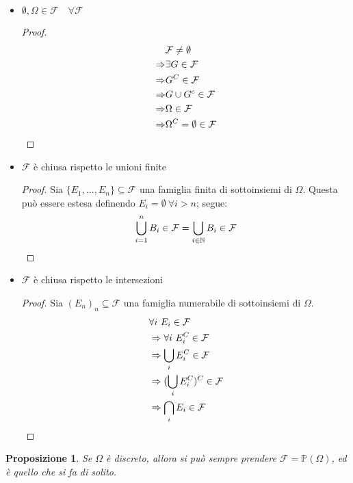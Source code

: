\documentclass{article}
\theoremstyle{plain}
\newtheorem{proposizione}{Proposizione}[section]
\theoremstyle{definition}
\theoremstyle{remark}
\begin{document}
\begin{itemize}
	\item $\emptyset,\Omega\in\mathcal{F}\quad\forall\mathcal{F}$
	\begin{proof}
		\begin{align*}
			&\mathcal{F}\neq\emptyset\\
			\Rightarrow&\exists G\in\mathcal{F}\\
			\Rightarrow&G^C\in\mathcal{F}\\
			\Rightarrow&G\cup G^c \in\mathcal{F}\\
			\Rightarrow&\Omega\in\mathcal{F}\\
			\Rightarrow&\Omega^C=\emptyset\in\mathcal{F}\qedhere
		\end{align*}
	\end{proof}
	\item $\mathcal{F}$ è chiusa rispetto le unioni finite
	\begin{proof}
		Sia $\{E_1,...,E_n\}\subseteq\mathcal{F}$ una famiglia finita di sottoinsiemi di $\Omega$. Questa può essere estesa definendo $E_i=\emptyset\ \forall i>n$; segue:
		\begin{equation*}
			\bigcup_{i=1}^n B_i\in\mathcal{F}=\bigcup_{i\in\mathbb{N}} B_i\in\mathcal{F}\qedhere
		\end{equation*}
	\end{proof}
	\item $\mathcal{F}$ è chiusa rispetto le intersezioni
	\begin{proof}
		Sia $(E_n)_n\subseteq\mathcal{F}$ una famiglia numerabile di sottoinsiemi di $\Omega$.
		\begin{align*}
			 &\forall i\ E_i\in\mathcal{F}\\
			 &\Rightarrow\forall i\ E_i^C\in\mathcal{F}\\
			 &\Rightarrow\bigcup_i E_i^C\in\mathcal{F}\\
			 &\Rightarrow(\bigcup_i E_i^C)^C\in\mathcal{F}\\
			 &\Rightarrow\bigcap_i E_i\in\mathcal{F}\qedhere
		\end{align*}
	\end{proof}
\end{itemize}
\begin{proposizione}
	Se $\Omega$ è discreto, allora si può sempre prendere $\mathcal{F}=\mathds{P}(\Omega)$, ed è quello che si fa di solito.
\end{proposizione}
\end{document}
